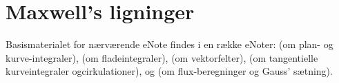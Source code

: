 

\setcounter{chapter}{27} %


%
%
%
%
%
%


\chapter{Maxwell's ligninger} \label{tn28}


\begin{basis}
Basismaterialet for nærværende eNote findes i en række eNoter:  (om plan- og kurve-integraler),  (om fladeintegraler),  (om vektorfelter),  (om tangentielle kurveintegraler ogcirkulationer), og  (om flux-beregninger og Gauss' sætning).
\end{basis}




